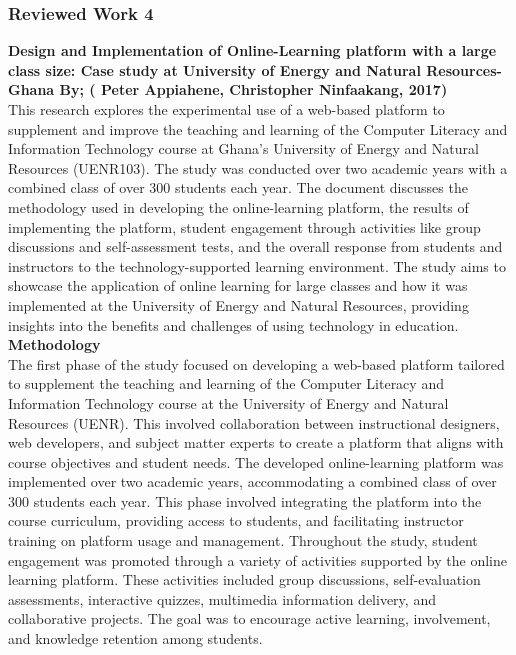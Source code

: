 \documentclass[a4paper,12pt]{article}  %
\begin{document}
\subsubsection{ Reviewed Work 4}
\large\textbf{Design and Implementation of Online-Learning platform with a large class size:
      Case study at University of Energy and Natural Resources-Ghana By; ( Peter
      Appiahene, Christopher Ninfaakang, 2017)}\\

This research explores the experimental use of a web-based platform to
supplement and improve the teaching and learning of the Computer Literacy and
Information Technology course at Ghana's University of Energy and Natural
Resources (UENR103). The study was conducted over two academic years with a
combined class of over 300 students each year. The document discusses the
methodology used in developing the online-learning platform, the results of
implementing the platform, student engagement through activities like group
discussions and self-assessment tests, and the overall response from students
and instructors to the technology-supported learning environment. The study
aims to showcase the application of online learning for large classes and how
it was implemented at the University of Energy and Natural Resources, providing
insights into the benefits and challenges of using technology in
education.\cite{appiahene2017design}\\

\textbf{Methodology }\\
The first phase of the study focused on developing a web-based
platform tailored to supplement the teaching and learning of the Computer
Literacy and Information Technology course at the University of Energy and
Natural Resources (UENR). This involved collaboration between instructional
designers, web developers, and subject matter experts to create a platform that
aligns with course objectives and student needs. The developed online-learning
platform was implemented over two academic years, accommodating a combined
class of over 300 students each year. This phase involved integrating the
platform into the course curriculum, providing access to students, and
facilitating instructor training on platform usage and management. Throughout
the study, student engagement was promoted through a variety of activities
supported by the online learning platform. These activities included group
discussions, self-evaluation assessments, interactive quizzes, multimedia
information delivery, and collaborative projects. The goal was to encourage
active learning, involvement, and knowledge retention among students.\\
\end{document}

